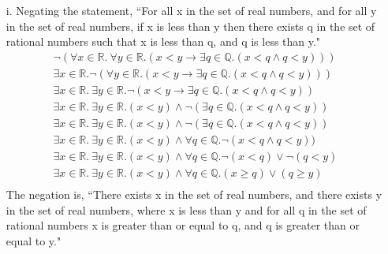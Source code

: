 \documentclass[10pt,letter]{article}
\begin{document}
\begin{enumerate}
\item[i.] Negating the statement, ``For all x in the set of real numbers, and for all y in the set of real numbers, if x is less than y then there exists q in the set of rational numbers such that x is less than q, and q is less than y."
\begin{gather}
\neg(\forall x \in \mathbb{R}.\ \forall y \in \mathbb{R}. (x < y \rightarrow \exists q \in \mathbb{Q}. (x < q \wedge q < y)))\\
\exists x \in \mathbb{R}. \neg (\forall y \in \mathbb{R}. (x < y \rightarrow \exists q \in \mathbb{Q}. (x < q \wedge q < y)))\\
\exists x \in \mathbb{R}.\ \exists y \in \mathbb{R}. \neg(x < y \rightarrow \exists q \in \mathbb{Q}. (x < q \wedge q < y))\\
\exists x \in \mathbb{R}.\ \exists y \in \mathbb{R}. (x < y) \wedge \neg(\exists q \in \mathbb{Q}. (x < q \wedge q < y))\\
\exists x \in \mathbb{R}.\ \exists y \in \mathbb{R}. (x < y) \wedge \neg(\exists q \in \mathbb{Q}. (x < q \wedge q < y))\\
\exists x \in \mathbb{R}.\ \exists y \in \mathbb{R}. (x < y) \wedge \forall q \in \mathbb{Q}. \neg(x < q \wedge q < y))\\
\exists x \in \mathbb{R}.\ \exists y \in \mathbb{R}. (x < y) \wedge \forall q \in \mathbb{Q}. \neg(x < q) \vee \neg(q < y)\\
\exists x \in \mathbb{R}.\ \exists y \in \mathbb{R}. (x < y) \wedge \forall q \in \mathbb{Q}. (x \geq q) \vee (q \geq y)\\
\end{gather}
The negation is, ``There exists x in the set of real numbers, and there exists y in the set of real numbers, where x is less than y and for all q in the set of rational numbers x is greater than or equal to q, and q is greater than or equal to y."\\


\end{enumerate}
\end{document}
